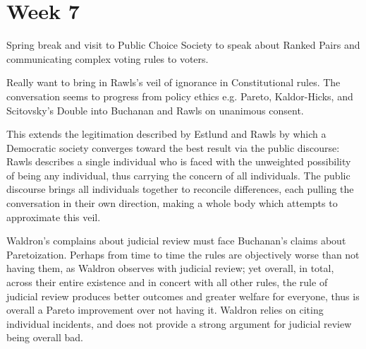 
\section{Week 7} %

Spring break and visit to Public Choice Society to speak about Ranked Pairs and communicating complex voting rules to voters.

Really want to bring in Rawls's veil of ignorance in Constitutional rules.  The conversation seems to progress from policy ethics e.g. Pareto, Kaldor-Hicks, and Scitovsky's Double into Buchanan and Rawls on unanimous consent.

This extends the legitimation described by Estlund and Rawls by which a Democratic society converges toward the best result via the public discourse:  Rawls describes a single individual who is faced with the unweighted possibility of being any individual, thus carrying the concern of all individuals.  The public discourse brings all individuals together to reconcile differences, each pulling the conversation in their own direction, making a whole body which attempts to approximate this veil.

Waldron's complains about judicial review must face Buchanan's claims about Paretoization.  Perhaps from time to time the rules are objectively worse than not having them, as Waldron observes with judicial review; yet overall, in total, across their entire existence and in concert with all other rules, the rule of judicial review produces better outcomes and greater welfare for everyone, thus is overall a Pareto improvement over not having it.  Waldron relies on citing individual incidents, and does not provide a strong argument for judicial review being overall bad.
